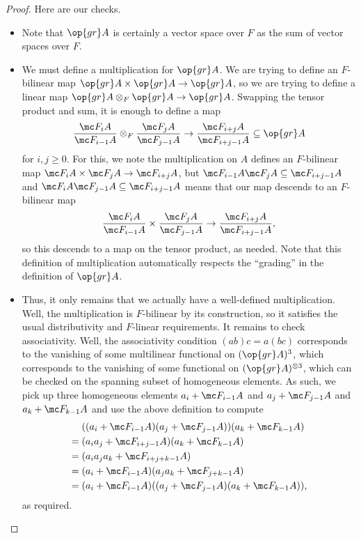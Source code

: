 \documentclass[../notes.tex]{subfiles}
\begin{document}
\begin{proof}
	Here are our checks.
	\begin{itemize}
		\item Note that $\op{gr}A$ is certainly a vector space over $F$ as the sum of vector spaces over $F$.
		\item We must define a multiplication for $\op{gr}A$. We are trying to define an $F$-bilinear map $\op{gr}A\times\op{gr}A\to\op{gr}A$, so we are trying to define a linear map $\op{gr}A\otimes_F\op{gr}A\to\op{gr}A$. Swapping the tensor product and sum, it is enough to define a map
		\[\frac{\mc F_iA}{\mc F_{i-1}A}\otimes_F\frac{\mc F_jA}{\mc F_{j-1}A}\to\frac{\mc F_{i+j}A}{\mc F_{i+j-1}A}\subseteq\op{gr}A\]
		for $i,j\ge0$. For this, we note the multiplication on $A$ defines an $F$-bilinear map $\mc F_iA\times\mc F_jA\to\mc F_{i+j}A$, but $\mc F_{i-1}A\mc F_jA\subseteq\mc F_{i+j-1}A$ and $\mc F_iA\mc F_{j-1}A\subseteq\mc F_{i+j-1}A$ means that our map descends to an $F$-bilinear map
		\[\frac{\mc F_iA}{\mc F_{i-1}A}\times\frac{\mc F_jA}{\mc F_{j-1}A}\to\frac{\mc F_{i+j}A}{\mc F_{i+j-1}A},\]
		so this descends to a map on the tensor product, as needed. Note that this definition of multiplication automatically respects the ``grading'' in the definition of $\op{gr}A$.
		\item Thus, it only remains that we actually have a well-defined multiplication. Well, the multiplication is $F$-bilinear by its construction, so it satisfies the usual distributivity and $F$-linear requirements. It remains to check associativity. Well, the associativity condition $(ab)c=a(bc)$ corresponds to the vanishing of some multilinear functional on $(\op{gr}A)^3$, which corresponds to the vanishing of some functional on $(\op{gr}A)^{\otimes3}$, which can be checked on the spanning subset of homogeneous elements. As such, we pick up three homogeneous elements $a_i+\mc F_{i-1}A$ and $a_j+\mc F_{j-1}A$ and $a_k+\mc F_{k-1}A$ and use the above definition to compute
		\begin{align*}
			& ((a_i+\mc F_{i-1}A)(a_j+\mc F_{j-1}A))(a_k+\mc F_{k-1}A) \\
			={}& (a_ia_j+\mc F_{i+j-1}A)(a_k+\mc F_{k-1}A) \\
			={}& (a_ia_ja_k+\mc F_{i+j+k-1}A) \\
			={}& (a_i+\mc F_{i-1}A)(a_ja_k+\mc F_{j+k-1}A) \\
			={}& (a_i+\mc F_{i-1}A)((a_j+\mc F_{j-1}A)(a_k+\mc F_{k-1}A)),
		\end{align*}
		as required.
		\qedhere
	\end{itemize}
\end{proof}
\end{document}
